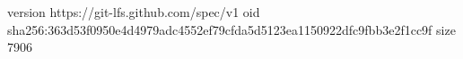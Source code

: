 version https://git-lfs.github.com/spec/v1
oid sha256:363d53f0950e4d4979adc4552ef79cfda5d5123ea1150922dfc9fbb3e2f1cc9f
size 7906
